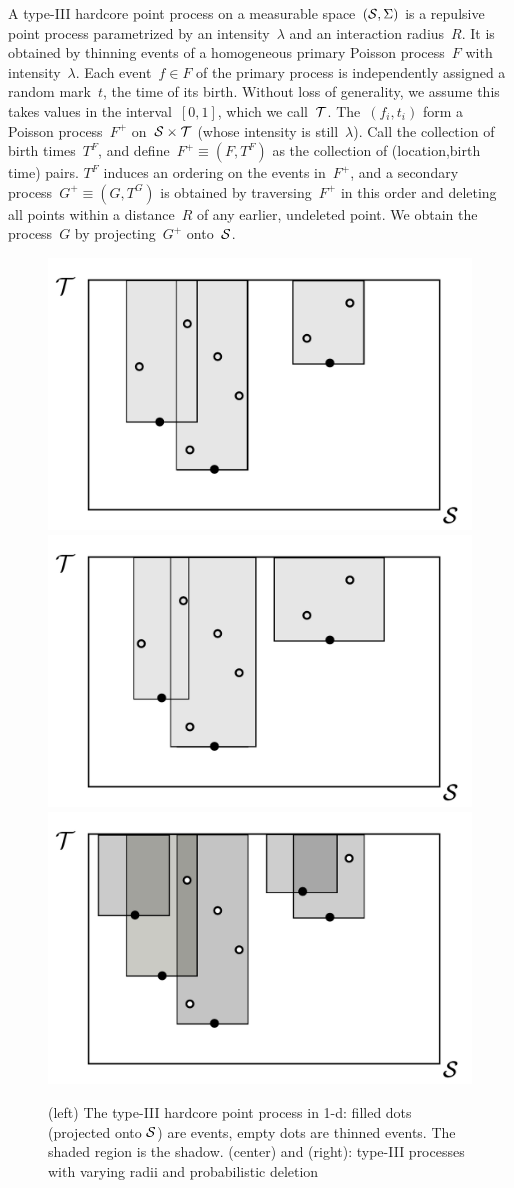 \documentclass{statsoc}
\begin{document}
   A \matern type-III hardcore point process on a measurable space~$({\mathcal S},\Sigma)$
 is a repulsive point process parametrized by an intensity~$\lambda$ and an 
interaction radius~$R$. It is obtained by thinning events
of a homogeneous {primary} Poisson process~$F$ with intensity~$\lambda$. 
Each event~${f \in F}$ of the primary process is independently assigned a random mark~$t$, the time of its
birth. Without loss of generality, we assume this takes values in the interval~$[0,1]$, which
we call~${\mathcal T}$. %
The~$(f_i, t_i)$ form a Poisson process~${F}^{+}$
on~${{\mathcal S} \times {\mathcal T}}$ (whose intensity is still~$\lambda$). 
Call the collection of birth times~$T^F$, and define~${F^{+} \equiv (F,T^F)}$ as the collection of (location,birth time) pairs. $T^F$ induces an ordering on the 
events in~${F}^{+}$, %
and a secondary process~${G^{+} \equiv (G, T^G)}$ is obtained by traversing~$F^{+}$ in this order and deleting all points within 
a distance~$R$ of any {earlier}, {undeleted} point. We obtain the \matern process~$G$ by projecting~$G^{+}$ onto~${\mathcal S}$.

   \begin{figure}
   \centering
     \includegraphics[width=.3\textwidth]{figs/matern3_fig.pdf}
    \includegraphics[width=.3\textwidth]{figs/matern3_fig_sc.pdf}
    \includegraphics[width=.3\textwidth]{figs/matern3_fig_prob.pdf}
 \caption[The \matern type-III hardcore point process]{(left) The \matern type-III hardcore point process in 1-d: filled dots (projected
  onto ${\mathcal S}$) are \matern events, empty dots are thinned events.  The shaded
 region is the shadow.
(center) and (right): \matern type-III processes with varying radii and probabilistic deletion}
   \label{fig:matern3_fig}
   \end{figure}
\end{document}
